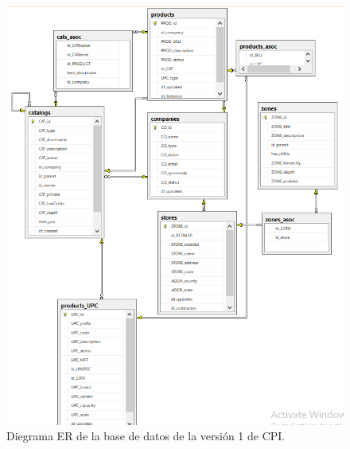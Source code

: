 \begin{itemize}
\begin{figure}[hbt]
\begin{center}
        \includegraphics[scale=0.8]{er_viejo.png}
        \caption{Diegrama ER de la base de datos de la versión 1 de CPI.}
        \label{fig:er_viejo}
        \end{center}
        \end{figure}


\end{itemize}

